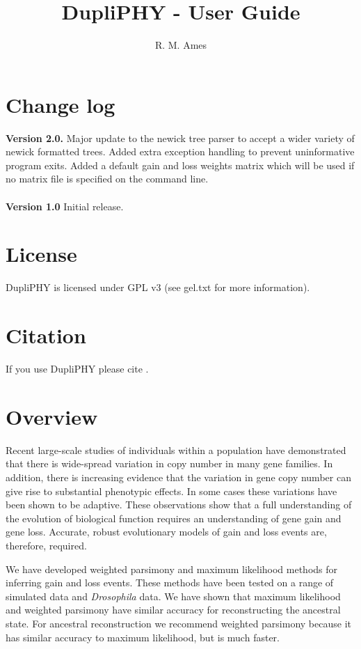 \documentclass[10pt]{report}
\title{DupliPHY - User Guide}
\author{R. M. Ames}
\date{}
\begin{document}
\maketitle
\tableofcontents

\section{Change log}

{\bf Version 2.0.} Major update to the newick tree parser to accept a wider variety of newick formatted trees. Added extra exception handling to prevent uninformative program exits. Added a default gain and loss weights matrix which will be used if no matrix file is specified on the command line.
\\
\\
{\bf Version 1.0} Initial release.  

\section{License}

DupliPHY is licensed under GPL v3 (see gel.txt for more information).

\section{Citation}

If you use DupliPHY please cite \cite{ames2012determining}.

\section{Overview}

Recent large-scale studies of individuals within a population have demonstrated that there is wide-spread variation in copy number in many gene families.  In addition, there is increasing evidence that the variation in gene copy number can give rise to substantial phenotypic effects.  In some cases these variations have been shown to be adaptive.  These observations show that a full understanding of the evolution of biological function requires an understanding of gene gain and gene loss.  Accurate, robust evolutionary models of gain and loss events are, therefore, required.

We have developed weighted parsimony and maximum likelihood methods for inferring gain and loss events\cite{ames2012determining}. These methods have been tested on a range of simulated data and {\it Drosophila} data.  We have shown that maximum likelihood and weighted parsimony have similar accuracy for reconstructing the ancestral state.  For ancestral reconstruction we recommend weighted parsimony because it has similar accuracy to maximum likelihood, but is much faster.
\end{document}
